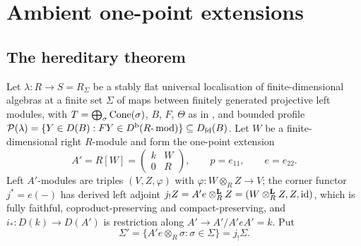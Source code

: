 \section{Ambient one-point extensions}\label{sec:ambient}

\subsection{The hereditary theorem}
Let \(\lambda:R\to S=R_\Sigma\) be a stably flat universal localisation of finite-dimensional algebras at a finite set \(\Sigma\) of maps between finitely generated projective left modules, with \(T=\bigoplus_\sigma\operatorname{Cone}(\sigma)\), \(B\), \(F\), \(\Theta\) as in , and bounded profile \(\mathcal P(\lambda)=\{Y\in D(B):FY\in D^{\mathrm b}(R\text{-}\operatorname{mod})\}\subseteq D_{\mathrm{fd}}(B)\).  Let \(W\) be a finite-dimensional right \(R\)-module and form the one-point extension
\[
 A'=R[W]=\begin{pmatrix}k&W\\0&R\end{pmatrix},\qquad p=e_{11},\qquad e=e_{22}.
\]
Left \(A'\)-modules are triples \((V,Z,\varphi)\) with \(\varphi:W\otimes_RZ\to V\); the corner functor \(j^*=e(-)\) has derived left adjoint \(j_!Z=A'e\otimes^{\mathbf L}_RZ=(W\otimes^{\mathbf L}_RZ,Z,\operatorname{id})\), which is fully faithful, coproduct-preserving and compact-preserving, and \(i_*:D(k)\to D(A')\) is restriction along \(A'\to A'/A'eA'=k\).  Put
\[
 \Sigma'=\{A'e\otimes_R\sigma:\sigma\in\Sigma\}=j_!\Sigma .
\]

